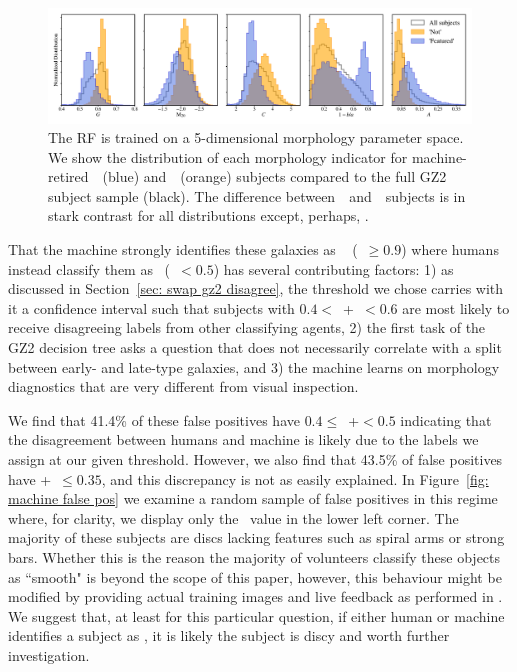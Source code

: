 \begin{figure}[t!]
\centering
\includegraphics[width=7in]{Figures/human_machine/f10.pdf}
\caption[Distributions of measured galaxy morphology features]{The RF is trained on a 5-dimensional morphology parameter space. We show the distribution of each morphology indicator for machine-retired~\feat~(blue) and~\notfeat~(orange) subjects compared to the full GZ2 subject sample (black). The difference between~\feat~and~\notfeat~subjects is in stark contrast for all distributions except, perhaps, .  \label{fig: morph params}}
\end{figure}

That the machine strongly identifies these galaxies as \feat~
(\pmachine~$\ge 0.9$) where humans instead classify them as \notfeat~(\ffeat~$< 0.5$) 
has several contributing factors: 1) as discussed in Section~\ref{sec: swap gz2 disagree}, 
the threshold we chose carries with it a confidence interval such that subjects with 
$0.4 <$~\ffeat+\fstar~$< 0.6$ are most likely to receive disagreeing labels from 
other classifying agents, 2) the first task of the GZ2 decision tree asks a 
question that does not necessarily correlate with a split between early- and
 late-type galaxies, and 3) the machine learns on morphology diagnostics
 that are very different from visual inspection.

We find that 41.4\% of these false positives have $0.4 \le$~\ffeat+\fstar$<0.5$ 
indicating that the disagreement between humans and machine is likely due to the 
labels we assign at our given threshold. However, we also find that 43.5\% of false 
positives have \ffeat+\fstar~$\le0.35$, and this discrepancy is not as easily explained. 
 In Figure~\ref{fig: machine false pos} we examine a random sample of false positives 
in this regime where, for clarity, we display only the \ffeat~value in the lower left corner. 
The majority of these subjects are discs lacking features such as spiral arms or strong bars. 
Whether this is the reason the majority of volunteers classify these objects as 
``smooth" is beyond the scope of this paper, however, this behaviour might be 
modified by providing actual training images and live feedback as performed in
 \cite{Marshall2016}. We suggest that, at least for this particular question, 
if either human or machine identifies a subject as \feat, it is likely the subject 
is discy and worth further investigation.



